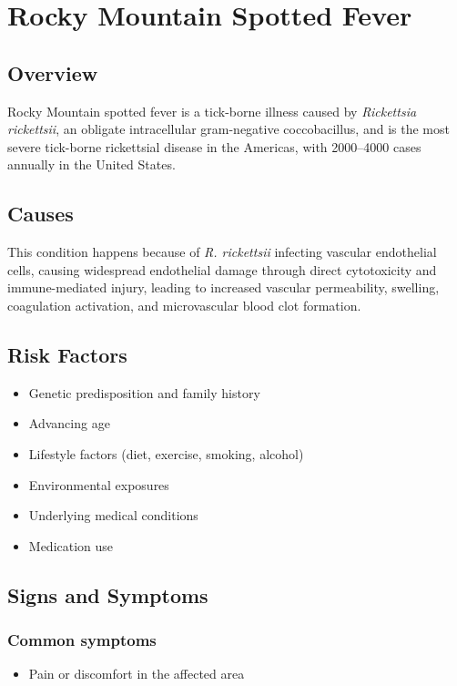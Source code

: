 \chapter{Rocky Mountain Spotted Fever}
\label{sec:Rocky Mountain Spotted Fever}

\section{Overview}
Rocky Mountain spotted fever is a tick-borne illness caused by \textit{Rickettsia rickettsii}, an obligate intracellular gram-negative coccobacillus, and is the most severe tick-borne rickettsial disease in the Americas, with 2000--4000 cases annually in the United States.
\section{Causes}
This condition happens because of \textit{R. rickettsii} infecting vascular endothelial cells, causing widespread endothelial damage through direct cytotoxicity and immune-mediated injury, leading to increased vascular permeability, swelling, coagulation activation, and microvascular blood clot formation.     
\section{Risk Factors}

\begin{itemize}[noitemsep]
  \item Genetic predisposition and family history
  \item Advancing age
  \item Lifestyle factors (diet, exercise, smoking, alcohol)
  \item Environmental exposures
  \item Underlying medical conditions
  \item Medication use
\end{itemize}
\section{Signs and Symptoms}

\subsection{Common symptoms}
\begin{itemize}[noitemsep]
  \item Pain or discomfort in the affected area
  \end{itemize}

